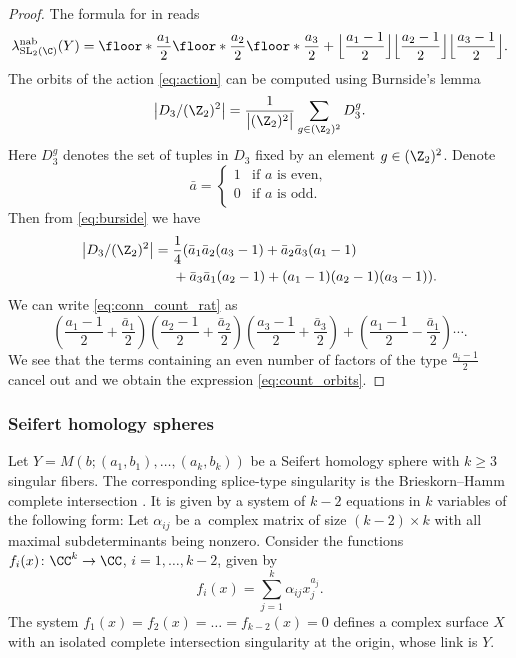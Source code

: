 \documentclass[10pt,a4paper]{amsart}
\begin{document}
\begin{proof}
 The formula for  in \cite[p.~20]{CuQiWa21} reads
 \begin{equation}\label{eq:conn_count_rat}
\lambda^{\rm nab}_{\operatorname{SL}_2(\C)}(Y) = \floor*{\frac{a_1}{2}}\floor*{\frac{a_2}{2}}\floor*{\frac{a_3}{2}}+\Big\lfloor\frac{a_1-1}{2}\Big\rfloor\Big\lfloor\frac{a_2-1}{2}\Big\rfloor
 \Big\lfloor\frac{a_3-1}{2}\Big\rfloor.
 \end{equation}
 The orbits of the action \eqref{eq:action} can be computed using Burnside's lemma
 \begin{equation}\label{eq:burside}
 \big\lvert D_3/(\Z_2)^2\big\rvert = \frac{1}{\big\lvert(\Z_2)^2\big\rvert} \sum_{g \in (\Z_2)^2} D_3^g.
 \end{equation}
 Here $D_3^g$ denotes the set of tuples in $D_3$ fixed by an element $g \in (\Z_2)^2$.
Denote
 \[
 \bar{a} =
 \begin{cases}
 1 & \text{if } a \text{ is even},\\
 0 & \text{if } a \text{ is odd}.\\
 \end{cases}
 \]
Then from \eqref{eq:burside} we have
\begin{align}
\big\lvert D_3/(\Z_2)^2\big\rvert
={}& \frac14 (\bar{a}_1\bar{a}_2(a_3-1)+\bar{a}_2\bar{a}_3(a_1-1)\nonumber\\
&+\bar{a}_3\bar{a}_1(a_2-1)+(a_1-1)(a_2-1)(a_3-1)).\label{eq:count_orbits}
\end{align}
We can write \eqref{eq:conn_count_rat} as
\[
 \left(\frac{a_1-1}{2}+\frac{\bar{a}_1}{2}\right)\left(\frac{a_2-1}{2}+\frac{\bar{a}_2}{2}\right)\left(\frac{a_3-1}{2}+\frac{\bar{a}_3}{2}\right)+\left(\frac{a_1-1}{2}-\frac{\bar{a}_1}{2}\right)\cdots.
\]
We see that the terms containing an even number of factors of the type $\frac{a_i-1}{2}$ cancel out and we obtain the expression \eqref{eq:count_orbits}.
\end{proof}

\subsubsection{Seifert homology spheres}

Let $Y = M(b;(a_1, b_1), \dots, (a_k, b_k))$ be a Seifert homology sphere with $k \geq 3$ singular fibers. The corresponding splice-type singularity is the Brieskorn--Hamm complete intersection \cite{Neu83}. It is given by a system of $k-2$ equations in $k$ variables of the following form: Let $\alpha_{ij}$ be a~complex matrix of size $(k-2) \times k$ with all maximal subdeterminants being nonzero. Consider the functions~$f_i(x)\colon \CC^k \rightarrow \CC$, $i = 1, \dots, k-2$, given by
\begin{equation}\label{icis}
	f_i(x) = \sum_{j=1}^k \alpha_{ij} x_j^{a_j}.
\end{equation}
The system
$
	f_1(x) = f_2(x) = \dots = f_{k-2}(x) = 0
$
defines a complex surface $X$ with an isolated complete intersection singularity at the origin, whose link is $Y$.
\end{document}
